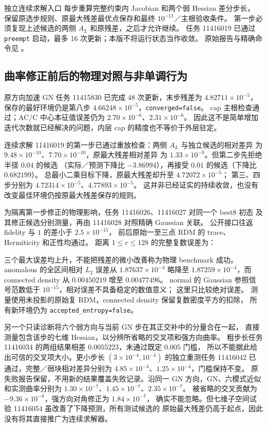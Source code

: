 \documentclass[11pt]{article}
\newcommand{\code}[1]{{\small\texttt{#1}}}
\begin{document}
独立连续求解入口 
每步重算完整约束内 Jacobian 和两个弱 Hessian 差分步长，
保留原选步规则、原最大残差最优点保存和最终 $10^{-11}$／主根验收条件。
第一步必须复现上述候选的两侧 $A_L$ 和原残差，之后才允许继续。
任务 11416019 已通过 \code{preempt} 启动，最多 16 次更新；本版不将运行状态当作收敛。
原始报告与精确命令见
。

\subsection{曲率修正前后的物理对照与非单调行为}
原方向加速 GN 任务 11415830 已完成 48 次更新，末步残差为
$4.82711\times10^{-5}$，保存的最好环境仍是第八步
$4.66248\times10^{-5}$，\code{converged=false}。
cap 主根检查通过；AC/C 中心本征值误差仍为
$2.70\times10^{-6}$、$2.31\times10^{-6}$。
因此这不是简单增加迭代次数就已经解决的问题，内层 cap 的精度也不等价于外层驻定。

连续求解 11416019 的第一步已通过重放检查：两侧 $A_L$ 与独立候选的相对差异
为 $9.48\times10^{-10}$、$7.70\times10^{-10}$，原最大残差相对差异
为 $1.33\times10^{-9}$。但第二步先拒绝半径 $0.04$ 的候选
（实际／预测下降比 $-3.86994$），再接受 $0.01$ 的候选（下降比 $0.682199$）。
总最小二乘目标下降，原最大残差却升至 $4.72072\times10^{-5}$；
第三、四步分别为 $4.72314\times10^{-5}$、$4.77893\times10^{-5}$。
这并非已经证实的持续收敛，也没有改变最佳环境仍按原最大残差保存的规则。

为隔离第一步修正的物理影响，任务 11416026、11416027 对同一个 best8 初态
及其修正候选分别测量，再由 11416028 对照精确 Gaussian 关联。
公开接口往返 fidelity 与 $1$ 的差小于 $2.5\times10^{-15}$，
前后原始一至三点 RDM 的 trace、Hermiticity 和正性均通过。
距离 $1\leq r\leq128$ 的完整复数误差为：
\begin{center}\small

\end{center}
三个最大误差均上升，不能把残差的微小改善称为物理 benchmark 成功。
anomalous 的全区间相对 $L_2$ 误差从 $1.87637\times10^{-4}$ 略降至
$1.87259\times10^{-4}$，而 connected density 从 $0.00450219$ 增至 $0.00477496$。
normal 的 Gaussian 参照信号范数低于 $10^{-15}$，相对误差不具备稳定的数值意义；
这里只比较绝对误差。
测量使用未投影的原始复 RDM，connected density 保留复数密度平方的扣除，
所有新环境仍为 \code{accepted\_entropy=false}。

另一个只读诊断将六个弱方向与当前 GN 步在其正交补中的分量合在一起，
直接测量包含该步的七维 Hessian，以分辨所省略的交叉项和强方向曲率。
粗步长任务 11416034 的两组结果相差 $0.0055223$，未通过既定 $0.005$ 门槛，
所以不能据此给出可信的交叉项大小。更小步长 $(3\times10^{-4},10^{-4})$
的独立重测任务 11416042 已通过，完整／弱块相对差异分别为
$4.85\times10^{-4}$、$1.25\times10^{-4}$，门槛保持不变。
原失败报告保留，不用新的结果覆盖失败记录。沿同一 GN 方向，GN、六模式近似
和实测曲率分别为 $1.30\times10^{-7}$、$1.45\times10^{-7}$、$2.35\times10^{-7}$。
被省略的交叉贡献为 $-9.36\times10^{-8}$，强方向对角修正为 $1.84\times10^{-7}$，
确实不能忽略。但七维子空间试验 11416054 虽改善了下降预测，所有测试候选的
原始最大残差仍高于起点，因此没有将其直接推广为连续求解器。
\end{document}
